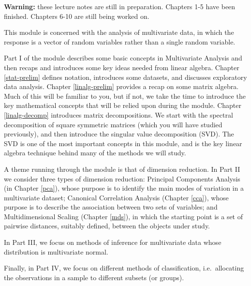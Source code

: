 \documentclass[]{book}
\theoremstyle{definition}
\theoremstyle{definition}
\theoremstyle{definition}
\theoremstyle{remark}
\begin{document}
\newcommand{\tcov}{\text{cov}}
\newcommand{\texp}{\text{exp}}
\newcommand{\lb}{\left(}
\newcommand{\rb}{\right)}
\newcommand{\lsb}{\left[}
\newcommand{\rsb}{\right]}
\newcommand{\BE}{{\mathbb{E}}}
\newcommand{\BP}{{\mathbb{P}}}
\newcommand{\cov}{{\mathbb{C}\operatorname{ov}}}
\newcommand{\var}{{\mathbb{V}\operatorname{ar}}}
\newcommand{\cor}{{\mathbb{C}\operatorname{or}}}

\textbf{Warning:} these lecture notes are still in preparation. Chapters 1-5 have been finished. Chapters 6-10 are still being worked on.

This module is concerned with the analysis of multivariate data, in which the response is a vector of random variables rather than a single random variable.

Part I of the module describes some basic concepts in Multivariate Analysis and then recaps and introduces some key ideas needed from linear algebra.
Chapter \ref{stat-prelim} defines notation, introduces some datasets, and discusses exploratory data analysis. Chapter \ref{linalg-prelim} provides a recap on some matrix algebra. Much of this will be familiar to you, but if not, we take the time to introduce the key mathematical concepts that will be relied upon during the module. Chapter \ref{linalg-decomp} introduces matrix decompositions. We start with the spectral decomposition of square symmetric matrices (which you will have studied previously), and then introduce the singular value decomposition (SVD). The SVD is one of the most important concepts in this module, and is the key linear algebra technique behind many of the methods we will study.

A theme running through the module is that of dimension reduction. In Part II we consider three types of dimension reduction: Principal Components Analysis (in Chapter \ref{pca}),
whose purpose is to identify the main modes of variation in a multivariate dataset; Canonical Correlation Analysis (Chapter \ref{cca}), whose purpose is to describe the association between two sets of variables; and Multidimensional Scaling (Chapter \ref{mds}), in which the starting point is a set of pairwise distances, suitably defined, between the objects under study.

In Part III, we focus on methods of inference for multivariate data whose distribution is multivariate normal.

Finally, in Part IV, we focus on different methods of classification, i.e.~allocating the observations in a sample to different subsets (or groups).
\end{document}
